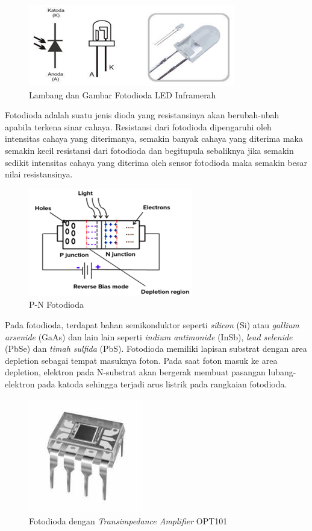 \begin{figure}[H]
    \centering
    \includegraphics{Images/Fotodioda.png}
    \caption{Lambang dan Gambar Fotodioda LED Inframerah}
    \label{fig:led photodiode}
\end{figure}

Fotodioda adalah suatu jenis dioda yang resistansinya akan berubah-ubah apabila terkena sinar
cahaya. Resistansi dari fotodioda dipengaruhi oleh intensitas cahaya yang diterimanya, semakin
banyak cahaya yang diterima maka semakin kecil resistansi dari fotodioda dan begitupula sebaliknya
jika semakin sedikit intensitas cahaya yang diterima oleh sensor fotodioda maka semakin besar nilai
resistansinya\cite{Setyaningsih2017,DendyArta2020}.

\begin{figure}[H]
    \centering
    \includegraphics{Images/Bias Fotodioda.png}
    \caption{P-N Fotodioda}
    \label{fig:p-n photodiode}
\end{figure}

Pada fotodioda, terdapat bahan semikonduktor seperti \textit{silicon} (Si) atau \textit{gallium
arsenide} (GaAs) dan lain lain seperti \textit{indium antimonide} (InSb), \textit{lead selenide}
(PbSe) dan \textit{timah sulfida} (PbS). Fotodioda memiliki lapisan substrat dengan area depletion
sebagai tempat masuknya foton. Pada saat foton masuk ke area depletion, elektron pada N-substrat
akan bergerak membuat pasangan lubang-elektron pada katoda sehingga terjadi arus listrik pada
rangkaian fotodioda\cite{Vlasov2023}.

\begin{figure}[H]
    \centering
    \includegraphics[width=5cm]{Images/OPT101.jpg}
    \caption{Fotodioda dengan \textit{Transimpedance Amplifier} OPT101}
    \label{fig:opt101}
\end{figure}

